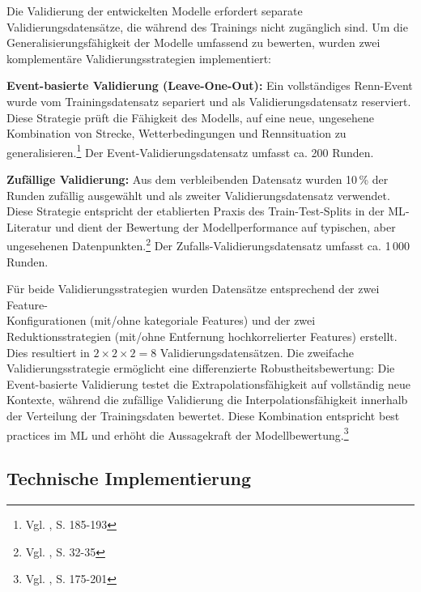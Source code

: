 Die Validierung der entwickelten Modelle erfordert separate Validierungsdatensätze, die während des Trainings nicht zugänglich sind. Um die Generalisierungsfähigkeit der Modelle umfassend zu bewerten, wurden zwei komplementäre Validierungsstrategien implementiert:

\textbf{Event-basierte Validierung (Leave-One-Out):}
Ein vollständiges Renn-Event wurde vom Trainingsdatensatz separiert und als Validierungsdatensatz reserviert. Diese Strategie prüft die Fähigkeit des Modells, auf eine neue, ungesehene Kombination von Strecke, Wetterbedingungen und Rennsituation zu generalisieren.\footnote{Vgl. \cite{James2021}, S. 185-193} Der Event-Validierungsdatensatz umfasst ca. 200 Runden.

\textbf{Zufällige Validierung:}
Aus dem verbleibenden Datensatz wurden 10\,\% der Runden zufällig ausgewählt und als zweiter Validierungsdatensatz verwendet. Diese Strategie entspricht der etablierten Praxis des Train-Test-Splits in der \ac{ML}-Literatur und dient der Bewertung der Modellperformance auf typischen, aber ungesehenen Datenpunkten.\footnote{Vgl. \cite{James2021}, S. 32-35} Der Zufalls-Validierungsdatensatz umfasst ca. 1\,000 Runden.

Für beide Validierungsstrategien wurden Datensätze entsprechend der zwei Feature-\\Konfigurationen (mit/ohne kategoriale Features) und der zwei Reduktionsstrategien (mit/ohne Entfernung hochkorrelierter Features) erstellt. Dies resultiert in $2 \times 2 \times 2 = 8$ Validierungsdatensätzen.
Die zweifache Validierungsstrategie ermöglicht eine differenzierte Robustheitsbewertung: Die Event-basierte Validierung testet die Extrapolationsfähigkeit auf vollständig neue Kontexte, während die zufällige Validierung die Interpolationsfähigkeit innerhalb der Verteilung der Trainingsdaten bewertet. Diese Kombination entspricht best practices im \ac{ML} und erhöht die Aussagekraft der Modellbewertung.\footnote{Vgl. \cite{James2021}, S. 175-201}


\subsection{Technische Implementierung}

